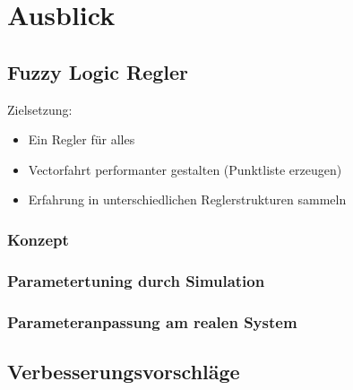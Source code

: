 \chapter{Ausblick}

\section{Fuzzy Logic Regler}
Zielsetzung:
\begin{itemize}
    \item Ein Regler für alles
    \item Vectorfahrt performanter gestalten (Punktliste erzeugen)
    \item Erfahrung in unterschiedlichen Reglerstrukturen sammeln
\end{itemize}
\subsection{Konzept}
\subsection{Parametertuning durch Simulation}
\subsection{Parameteranpassung am realen System}


\section{Verbesserungsvorschläge}
